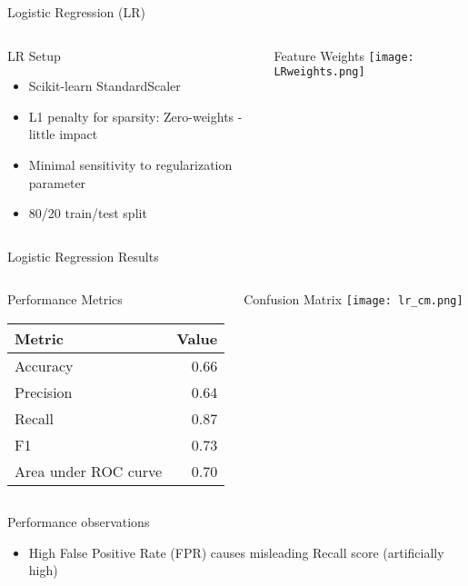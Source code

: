 \documentclass{beamer}
\begin{document}
\begin{frame}{Logistic Regression (LR)}
	
	\begin{columns}
		\column[T]{4.5cm}
		\begin{block}{LR Setup}
			\begin{itemize}
				\item Scikit-learn StandardScaler
				\item L1 penalty for sparsity:  Zero-weights - little impact
				\item Minimal sensitivity to regularization parameter
				\item 80/20 train/test split
			\end{itemize}
		\end{block}
		
		\column[T]{6.5cm}
		\begin{block}{Feature Weights}
			\texttt{[image: LRweights.png]}
		\end{block}	
	\end{columns}
	
\end{frame}

\begin{frame}{Logistic Regression Results}
	\begin{columns}
		\column[T]{6cm}
		\begin{block}{Performance Metrics}
			\begin{table}
				\begin{tabular}{lr}
					\textbf{Metric} & \textbf{Value} \\
					\hline
					Accuracy &  0.66 \\
					Precision & 0.64 \\
					Recall & 0.87 \\
					F1 & 0.73 \\
					Area under ROC curve & 0.70 \\	
				\end{tabular}
			\end{table}
			
		\end{block}
		
		\column[T]{4cm}
		\begin{block}{Confusion Matrix}
			\centering
			\texttt{[image: lr\_cm.png]}
		\end{block}	
		
	\end{columns}
	
		\begin{block}{Performance observations}
			\begin{itemize}
				\item High False Positive Rate (FPR) causes misleading Recall score (artificially high)
			\end{itemize}
			
		\end{block}	

	
\end{frame}
\end{document}
